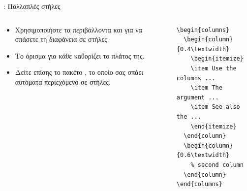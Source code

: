 \documentclass{beamer}
\begin{document}
\begin{frame}[fragile]{\insertsection: Πολλαπλές στήλες}
\begin{columns}
\begin{column}{0.4\textwidth}
\begin{itemize}
\item Χρησιμοποιήστε τα περιβάλλοντα \en {}\gr και \en {}\gr για να σπάσετε τη διαφάνεια
σε στήλες.
\item Το όρισμα για κάθε  καθορίζει το πλάτος της.
\item Δείτε επίσης το πακέτο \en {}\gr, το οποίο σας σπάει αυτόματα
περιεχόμενο σε στήλες.
\end{itemize}
\end{column}
\en
\begin{column}{0.6\textwidth}
\begin{verbatim}
\begin{columns}
  \begin{column}{0.4\textwidth}
    \begin{itemize}
    \item Use the columns ...
    \item The argument ...
    \item See also the ...
    \end{itemize}
  \end{column}
  \begin{column}{0.6\textwidth}
    % second column
  \end{column}
\end{columns}
\end{verbatim}
\end{column}
\end{columns}
\end{frame}
\end{document}
